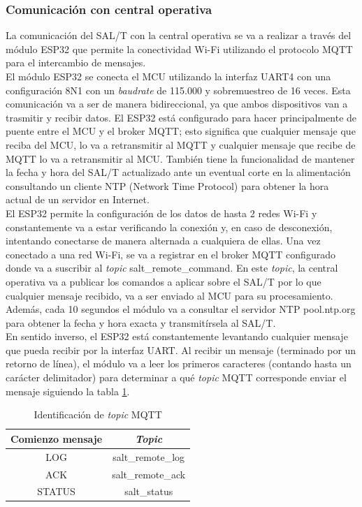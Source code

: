 \subsubsection{Comunicación con central operativa}

La comunicación del SAL/T con la central operativa se va a realizar a través del módulo ESP32 que permite la conectividad Wi-Fi utilizando el protocolo MQTT para el intercambio de mensajes. \\

El módulo ESP32 se conecta el MCU utilizando la interfaz UART4 con una configuración 8N1 con un \textit{baudrate} de 115.000 y sobremuestreo de 16 veces. Esta comunicación va a ser de manera bidireccional, ya que ambos dispositivos van a trasmitir y recibir datos. El ESP32 está configurado para hacer principalmente de puente entre el MCU y el broker MQTT; esto significa que cualquier mensaje que reciba del MCU, lo va a retransmitir al MQTT y cualquier mensaje que recibe de MQTT lo va a retransmitir al MCU. También tiene la funcionalidad de mantener la fecha y hora del SAL/T actualizado ante un eventual corte en la alimentación consultando un cliente NTP (Network Time Protocol) para obtener la hora actual de un servidor en Internet.\\ 

El ESP32 permite la configuración de los datos de hasta 2 redes Wi-Fi y constantemente va a estar verificando la conexión y, en caso de desconexión, intentando conectarse de manera alternada a cualquiera de ellas. Una vez conectado a una red Wi-Fi, se va a registrar en el broker MQTT configurado donde va a suscribir al \textit{topic} salt\_remote\_command. En este \textit{topic}, la central operativa va a publicar los comandos a aplicar sobre el SAL/T por lo que cualquier mensaje recibido, va a ser enviado al MCU para su procesamiento. Además, cada 10 segundos el módulo va a consultar el servidor NTP pool.ntp.org \cite{ntp} para obtener la fecha y hora exacta y transmitírsela al SAL/T. \\ 

En sentido inverso, el ESP32 está constantemente levantando cualquier mensaje que pueda recibir por la interfaz UART. Al recibir un mensaje (terminado por un retorno de línea), el módulo va a leer los primeros caracteres (contando hasta un carácter delimitador) para determinar a qué \textit{topic} MQTT corresponde enviar el mensaje siguiendo la tabla \ref{tab:mqtt_topics}.

\begin{table}[H]
    \centering
    \begin{tabular}{|c|c|}
        \hline
         \textbf{Comienzo mensaje} & \textbf{\textit{Topic}}  \\ \hline
         LOG & salt\_remote\_log  \\ \hline
         ACK & salt\_remote\_ack  \\ \hline
         STATUS  & salt\_status  \\          
         \hline
    \end{tabular}
    \caption{Identificación de \textit{topic} MQTT}
    \label{tab:mqtt_topics}
\end{table}



